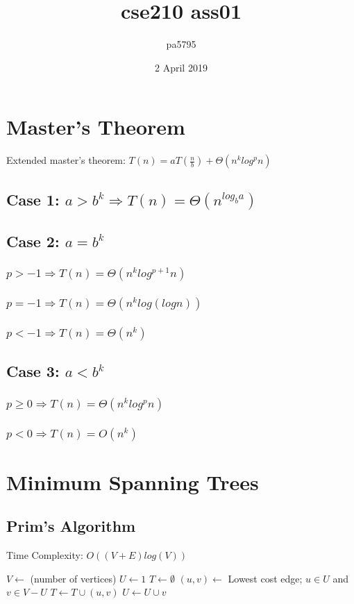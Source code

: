 \documentclass{article}
\title{cse210 ass01}
\author{pa5795}
\date{2 April 2019}
\begin{document}
\maketitle

\section{Master's Theorem}
Extended master's theorem: $T(n) = a T(\frac{n}{b}) + \Theta(n^k log^p n)$
\subsection{Case 1: $ a > b^k \Rightarrow T(n) = \Theta(n^{log_b a}) $}
\subsection{Case 2: $ a = b^k $}
\subsubsection{$ p > -1 \Rightarrow T(n) = \Theta(n^k log^{p+1} n)$}
\subsubsection{$ p = -1 \Rightarrow T(n) = \Theta(n^k log(log n))$}
\subsubsection{$ p < -1 \Rightarrow T(n) = \Theta(n^k)$}
\subsection{Case 3: $ a < b^k $}
\subsubsection{$ p \geq 0 \Rightarrow T(n) = \Theta(n^k log^p n)$}
\subsubsection{$ p < 0 \Rightarrow T(n) = O(n^k)$}


\section{Minimum Spanning Trees}
\subsection{Prim's Algorithm}
Time Complexity: $O((V+E) log(V))$
\begin{algorithm}
\begin{algorithmic}
\STATE $ V \leftarrow$ (number of vertices)
\STATE $ U \leftarrow 1 $
\STATE $ T \leftarrow \emptyset $
\STATE $ (u,v) \leftarrow$ Lowest cost edge; $u \in U$ and $v \in V-U $
\STATE $ T \leftarrow T \cup (u,v) $
\STATE $ U \leftarrow U \cup {v} $
\ENDWHILE
\end{algorithmic}
\end{algorithm}
\end{document}
